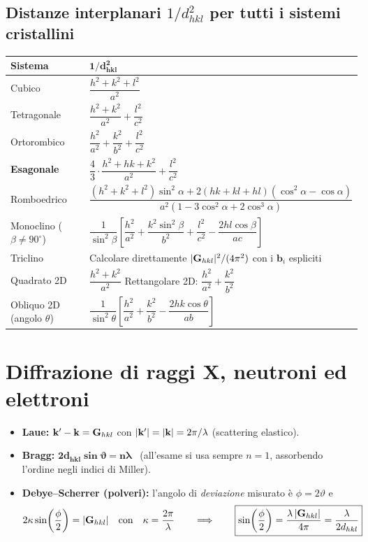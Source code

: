 \subsection{Distanze interplanari $1/d^2_{hkl}$ per tutti i sistemi cristallini}
\begin{center}
\renewcommand{\arraystretch}{1.9}
\begin{tabular}{l l}
\toprule
\textbf{Sistema} & $\bm{1/d^2_{hkl}}$ \\
\midrule
Cubico & $\dfrac{h^2+k^2+l^2}{a^2}$ \\
Tetragonale & $\dfrac{h^2+k^2}{a^2} + \dfrac{l^2}{c^2}$ \\
Ortorombico & $\dfrac{h^2}{a^2} + \dfrac{k^2}{b^2} + \dfrac{l^2}{c^2}$ \\
\textbf{Esagonale} & $\dfrac{4}{3}\cdot\dfrac{h^2+hk+k^2}{a^2} + \dfrac{l^2}{c^2}$ \\
Romboedrico & $\dfrac{(h^2+k^2+l^2)\sin^2\!\alpha + 2(hk+kl+hl)(\cos^2\!\alpha-\cos\alpha)}{a^2\left(1-3\cos^2\!\alpha+2\cos^3\!\alpha\right)}$ \\
Monoclino ($\beta\neq90^\circ$) & $\dfrac{1}{\sin^2\!\beta}\left[\dfrac{h^2}{a^2} + \dfrac{k^2\sin^2\!\beta}{b^2} + \dfrac{l^2}{c^2} - \dfrac{2hl\cos\beta}{ac}\right]$ \\
Triclino & Calcolare direttamente $|\mathbf{G}_{hkl}|^2/(4\pi^2)$ con i $\mathbf{b}_i$ espliciti \\[2pt]
Quadrato 2D & $\dfrac{h^2+k^2}{a^2}$ \qquad Rettangolare 2D: $\dfrac{h^2}{a^2}+\dfrac{k^2}{b^2}$ \\
Obliquo 2D (angolo $\theta$) & $\dfrac{1}{\sin^2\!\theta}\left[\dfrac{h^2}{a^2}+\dfrac{k^2}{b^2}-\dfrac{2hk\cos\theta}{ab}\right]$ \\
\bottomrule
\end{tabular}
\end{center}




\section{Diffrazione di raggi X, neutroni ed elettroni}


\begin{itemize}
  \item \textbf{Laue:} $\mathbf{k}' - \mathbf{k} = \mathbf{G}_{hkl}$ con $|\mathbf{k}'|=|\mathbf{k}|=2\pi/\lambda$ (scattering elastico).
  \item \textbf{Bragg:} $\bm{2 d_{hkl} \sin\vartheta = n\lambda}$ \ (all'esame si usa sempre $n=1$, assorbendo l'ordine negli indici di Miller).
  \item \textbf{Debye--Scherrer (polveri):} l'angolo di \emph{deviazione} misurato è $\phi = 2\vartheta$ e
  \[ 2\kappa \sin\!\left(\frac{\phi}{2}\right) = |\mathbf{G}_{hkl}| \quad\text{con}\quad \kappa=\frac{2\pi}{\lambda}
     \qquad\Longrightarrow\qquad
     \boxed{\sin\!\left(\frac{\phi}{2}\right) = \frac{\lambda\,|\mathbf{G}_{hkl}|}{4\pi} = \frac{\lambda}{2 d_{hkl}}} \]
\end{itemize}

